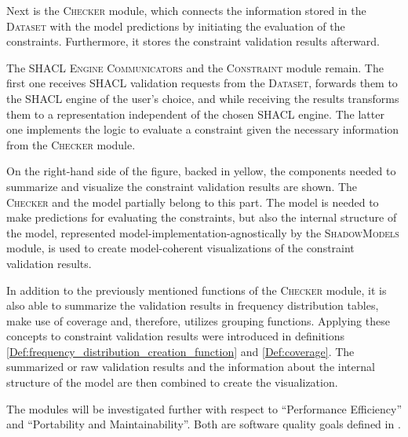 Next is the \textsc{Checker} module, which connects the information stored in the \textsc{Dataset} with the model predictions by initiating the evaluation of the constraints. Furthermore, it stores the constraint validation results afterward.

The \textsc{SHACL Engine Communicators} and the \textsc{Constraint} module remain. The first one receives SHACL validation requests from the \textsc{Dataset}, forwards them to the SHACL engine of the user's choice, and while receiving the results transforms them to a representation independent of the chosen SHACL engine. The latter one implements the logic to evaluate a constraint given the necessary information from the \textsc{Checker} module. 

On the right-hand side of the figure, backed in yellow, the components needed to summarize and visualize the constraint validation results are shown. The \textsc{Checker} and the model partially belong to this part. The model is needed to make predictions for evaluating the constraints, but also the internal structure of the model, represented model-implementation-agnostically by the \textsc{ShadowModels} module, is used to create model-coherent visualizations of the constraint validation results.

In addition to the previously mentioned functions of the \textsc{Checker} module, it is also able to summarize the validation results in frequency distribution tables, make use of coverage and, therefore, utilizes grouping functions. Applying these concepts to constraint validation results were introduced in definitions \ref{Def:frequency_distribution_creation_function} and \ref{Def:coverage}. 
The summarized or raw validation results and the information about the internal structure of the model are then combined to create the visualization. 

The modules will be investigated further with respect to ``Performance Efficiency'' and ``Portability and Maintainability''. Both are software quality goals defined in \cite{softwarequalitygoalsiso}.





